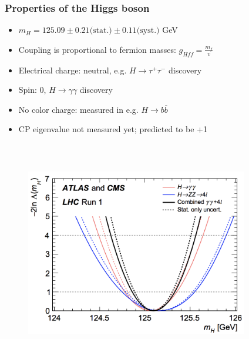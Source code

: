 \documentclass[xcolor={usenames,dvipsnames,svgnames,table}]{beamer}
\begin{document}
\begin{frame}
	\frametitle{Properties of the Higgs boson}
	\begin{itemize}
		\item $m_H = 125.09 \pm 0.21 \text{(stat.)} \pm 0.11 \text{(syst.)}$ GeV
		\item Coupling is proportional to fermion masses: $g_{Hff} = \frac{m_f}{v}$
		\item Electrical charge: neutral, e.g. $H \rightarrow \tau^+\tau^-$ discovery
		\item Spin: 0, $H \rightarrow \gamma\gamma$ discovery
		\item No color charge: measured in e.g. $H \rightarrow b\overline{b}$
		\item CP eigenvalue not measured yet; predicted to be +1
	\end{itemize}
	\begin{columns}
	\begin{column}{0.49\textwidth}
	\vspace{-0.9cm}\\
	\begin{figure}[t]
		\includegraphics[width=1.1\textwidth]{plots/higgsmass.png}
	\end{figure}
	\end{column}
	\begin{column}{0.49\textwidth}
	\vspace{-0.5cm}\\
	\begin{figure}[b]

\end{figure}
\end{column}
\end{columns}
\end{frame}
\end{document}
